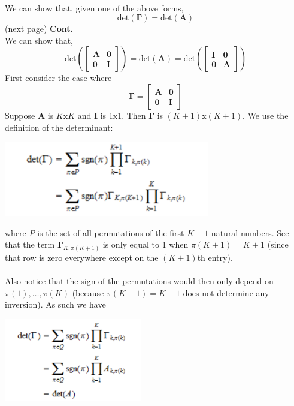 \documentclass{report}
\begin{document}
\vspace{1mm}\\
We can show that, given one of the above forms,
\begin{equation*}
\text{det}(\bm\Gamma)=\text{det}(\bm A)
\end{equation*}
(next page)\newpage
\noindent\textbf{Cont.}\\
We can show that, 
\begin{equation*}
\text{det}\left(\left[\begin{array}{cc}\bm A&\bm 0\\\bm 0&\bm I\end{array}\right]\right)=\text{det}(\bm A)=
\text{det}\left(\left[\begin{array}{cc}\bm I&\bm 0\\\bm 0&\bm A\end{array}\right]\right)
\end{equation*}
First consider the case where
\begin{equation*}
\bm\Gamma=\left[\begin{array}{cc}\bm A&\bm 0\\\bm 0&\bm I\end{array}\right]
\end{equation*}
Suppose $\bm A$ is $K$x$K$ and $\bm I$ is 1x1. Then $\bm\Gamma$ is $(K+1)$x$(K+1)$. We use the definition of the determinant:  
\begin{center}
\includegraphics[width=9cm]{121}
\end{center}
where $P$ is the set of all permutations of the first $K+1$ natural numbers. See that the term $\bm\Gamma_{K,\pi(K+1)}$ is only equal to 1 when $\pi(K+1)=K+1$ 
(since that row is zero everywhere except on the $(K+1)$th entry).\\
\vspace{1mm}\\
Also notice that the sign of the permutations would then only depend on $\pi(1),\ldots,\pi(K)$ (because $\pi(K+1)=K+1$ does not determine any inversion). As such we have
\begin{center}
\includegraphics[width=6cm]{122}
\end{center}
\end{document}
